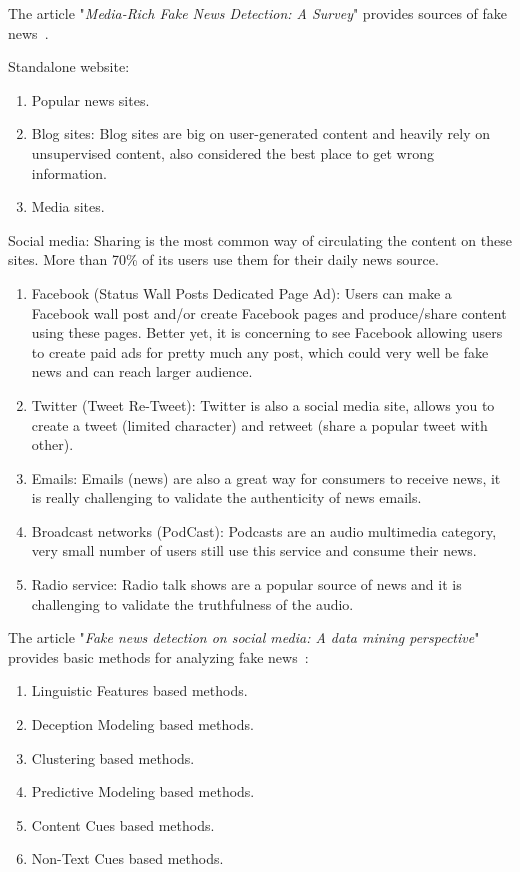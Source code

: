 The article "\textit{Media-Rich Fake News Detection: A Survey}" provides sources of fake news~\cite{3}.

Standalone website:
\begin{enumerate}
    \item Popular news sites.
    \item Blog sites: Blog sites are big on user-generated content and heavily rely on unsupervised content, also considered the best place to get wrong information.
    \item Media sites.
\end{enumerate}

Social media: Sharing is the most common way of circulating the content on these sites.
More than 70\% of its users use them for their daily news source.
\begin{enumerate}
    \item Facebook (Status \textemdash Wall Posts \textemdash Dedicated Page \textemdash Ad): Users can make a Facebook wall post and/or create Facebook pages and produce/share content using these pages.
    Better yet, it is concerning to see Facebook allowing users to create paid ads for pretty much any post, which could very well be fake news and can reach larger audience.
    \item Twitter (Tweet \textemdash Re-Tweet): Twitter is also a social media site, allows you to create a tweet (limited character) and retweet (share a popular tweet with other).
    \item Emails: Emails (news) are also a great way for consumers to receive news, it is really challenging to validate the authenticity of news emails.
    \item Broadcast networks (PodCast): Podcasts are an audio multimedia category, very small number of users still use this service and consume their news.
    \item Radio service: Radio talk shows are a popular source of news and it is challenging to validate the truthfulness of the audio.
\end{enumerate}

The article "\textit{Fake news detection on social media: A data mining perspective}" provides basic methods for analyzing fake news~\cite{9}:
\begin{enumerate}
    \item Linguistic Features based methods.
    \item Deception Modeling based methods.
    \item Clustering based methods.
    \item Predictive Modeling based methods.
    \item Content Cues based methods.
    \item Non-Text Cues based methods.
\end{enumerate}

